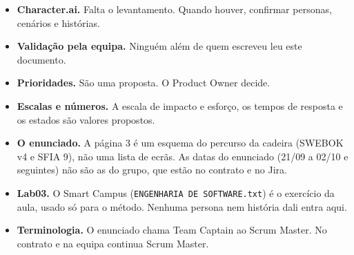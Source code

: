 \documentclass[12pt,a4paper]{article}
\begin{document}
\begin{itemize}
\item \textbf{Character.ai.} Falta o levantamento. Quando houver, confirmar personas, cenários e histórias.
\item \textbf{Validação pela equipa.} Ninguém além de quem escreveu leu este documento.
\item \textbf{Prioridades.} São uma proposta. O Product Owner decide.
\item \textbf{Escalas e números.} A escala de impacto e esforço, os tempos de resposta e os estados são valores propostos.
\item \textbf{O enunciado.} A página 3 é um esquema do percurso da cadeira (SWEBOK v4 e SFIA 9), não uma lista de ecrãs. As datas do enunciado (21/09 a 02/10 e seguintes) não são as do grupo, que estão no contrato e no Jira.
\item \textbf{Lab03.} O Smart Campus (\texttt{ENGENHARIA DE SOFTWARE.txt}) é o exercício da aula, usado só para o método. Nenhuma persona nem história dali entra aqui.
\item \textbf{Terminologia.} O enunciado chama Team Captain ao Scrum Master. No contrato e na equipa continua Scrum Master.
\end{itemize}
\end{document}
